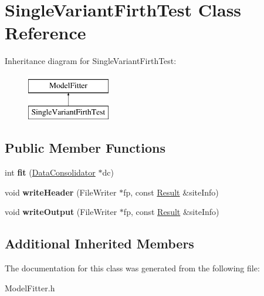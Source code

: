 \hypertarget{classSingleVariantFirthTest}{\section{Single\-Variant\-Firth\-Test Class Reference}
\label{classSingleVariantFirthTest}
}
Inheritance diagram for Single\-Variant\-Firth\-Test\-:\begin{figure}[H]
\begin{center}
\leavevmode
\includegraphics[height=2.000000cm]{classSingleVariantFirthTest}
\end{center}
\end{figure}
\subsection*{Public Member Functions}
\begin{DoxyCompactItemize}
\item 
\hypertarget{classSingleVariantFirthTest_a43fb9b330b4634ebb1051ec5fac81a56}{int {\bfseries fit} (\hyperlink{classDataConsolidator}{Data\-Consolidator} $\ast$dc)}\label{classSingleVariantFirthTest_a43fb9b330b4634ebb1051ec5fac81a56}

\item 
\hypertarget{classSingleVariantFirthTest_ad74ecdd1516432bacb7ac7d617cc007e}{void {\bfseries write\-Header} (File\-Writer $\ast$fp, const \hyperlink{classResult}{Result} \&site\-Info)}\label{classSingleVariantFirthTest_ad74ecdd1516432bacb7ac7d617cc007e}

\item 
\hypertarget{classSingleVariantFirthTest_adfcd926da6a84ae788f1165177bfc455}{void {\bfseries write\-Output} (File\-Writer $\ast$fp, const \hyperlink{classResult}{Result} \&site\-Info)}\label{classSingleVariantFirthTest_adfcd926da6a84ae788f1165177bfc455}

\end{DoxyCompactItemize}
\subsection*{Additional Inherited Members}


The documentation for this class was generated from the following file\-:\begin{DoxyCompactItemize}
\item 
Model\-Fitter.\-h\end{DoxyCompactItemize}
